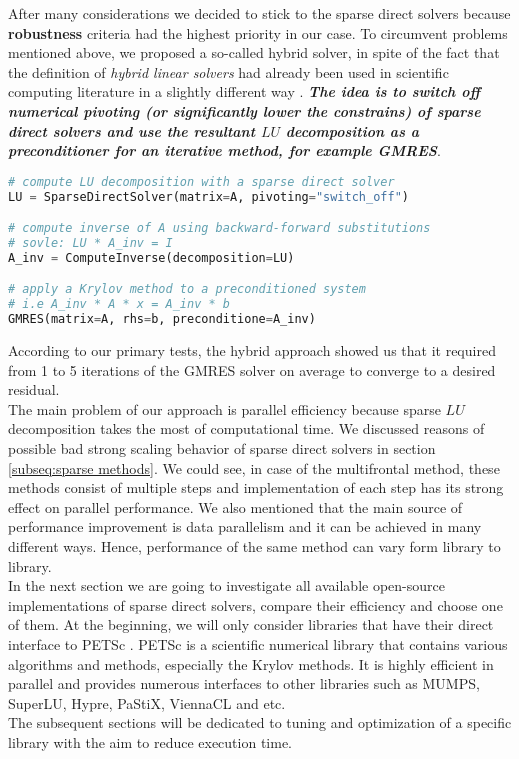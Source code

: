 After many considerations we decided to stick to the sparse direct solvers because \textbf{robustness} criteria had the highest priority in our case. To circumvent problems mentioned above, we proposed a so-called hybrid solver, in spite of the fact that the definition of \textit{hybrid linear solvers} had already been used in scientific computing literature in a slightly different way \cite{shylu-hybrid-solver}. \textbf{\textit{The idea is to switch off numerical pivoting (or significantly lower the constrains) of sparse direct solvers and use the resultant $LU$ decomposition as a preconditioner for an iterative method, for example GMRES}}.\\

\begin{lstlisting}[language=python, caption={A pseudo-code of the Hybrid approach}, frame=single]
# compute LU decomposition with a sparse direct solver
LU = SparseDirectSolver(matrix=A, pivoting="switch_off")

# compute inverse of A using backward-forward substitutions
# sovle: LU * A_inv = I
A_inv = ComputeInverse(decomposition=LU)

# apply a Krylov method to a preconditioned system 
# i.e A_inv * A * x = A_inv * b
GMRES(matrix=A, rhs=b, preconditione=A_inv)
\end{lstlisting}

According to our primary tests, the hybrid approach showed us that it required from 1 to 5 iterations of the GMRES solver on average to converge to a desired residual.\\


The main problem of our approach is parallel efficiency because sparse $LU$ decomposition takes the most of computational time. We discussed reasons of possible bad strong scaling behavior of sparse direct solvers in section \ref{subseq:sparse methods}. We could see, in case of the multifrontal method, these methods consist of multiple steps and implementation of each step has its strong effect on parallel performance. We also mentioned that the main source of performance improvement is data parallelism and it can be achieved in many different ways. Hence, performance of the same method can vary form library to library.\\


In the next section we are going to investigate all available open-source implementations of sparse direct solvers, compare their efficiency and choose one of them. At the beginning, we will only consider libraries that have their direct interface to PETSc \cite{petsc-web-page}. PETSc is a scientific numerical library that contains various algorithms and methods, especially the Krylov methods. It is highly efficient in parallel and provides numerous interfaces to other libraries such as MUMPS, SuperLU, Hypre, PaStiX, ViennaCL and etc.\\ 


The subsequent sections will be dedicated to tuning and optimization of a specific library with the aim to reduce execution time. \\